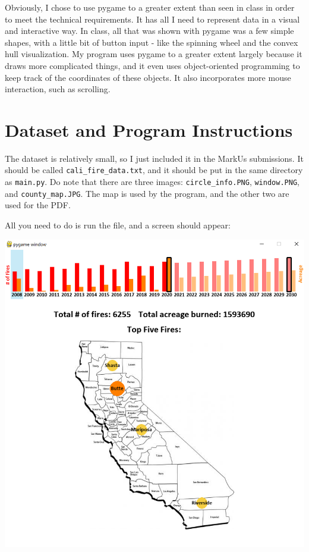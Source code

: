 \documentclass[fontsize=11pt]{article}
\begin{document}
Obviously, I chose to use pygame to a greater extent than seen in class in order to meet the technical requirements. It has all I need to represent data in a visual and interactive way. In class, all that was shown with pygame was a few simple shapes, with a little bit of button input - like the spinning wheel and the convex hull visualization. My program uses pygame to a greater extent largely because it draws more complicated things, and it even uses object-oriented programming to keep track of the coordinates of these objects. It also incorporates more mouse interaction, such as scrolling.

\section*{Dataset and Program Instructions}
The dataset is relatively small, so I just included it in the MarkUs submissions. It should be called \texttt{cali\_fire\_data.txt}, and it should be put in the same directory as \texttt{main.py}. Do note that there are three images: \texttt{circle\_info.PNG}, \texttt{window.PNG}, and \texttt{county\_map.JPG}. The map is used by the program, and the other two are used for the PDF. 

All you need to do is run the file, and a screen should appear:

\includegraphics[scale=0.5]{window.PNG}
\end{document}
